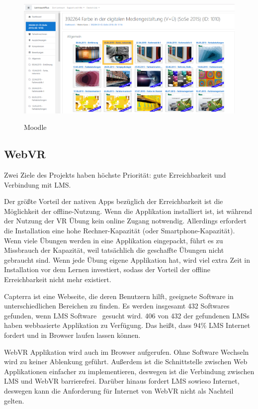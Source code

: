 \begin{figure}[ht]
\vspace*{1em}
\centering
\caption{Moodle}
\includegraphics[width=\textwidth]{images/moodleBeispiel.png}
\label{fig:moodleBeispiel} 
\end{figure}

 \subsection{WebVR}
 Zwei Ziele des Projekts haben höchste Priorität: gute Erreichbarkeit und Verbindung mit LMS.

 Der größte Vorteil der nativen Apps bezüglich der Erreichbarkeit ist die Möglichkeit der offline-Nutzung. Wenn die Applikation installiert ist, ist während der Nutzung der VR Übung kein online Zugang notwendig. Allerdings erfordert die Installation eine hohe Rechner-Kapazität (oder Smartphone-Kapazität). Wenn viele Übungen werden in eine Applikation eingepackt, führt es zu Missbrauch der Kapazität, weil tatsächlich die geschaffte Übungen nicht gebraucht sind. Wenn jede Übung eigene Applikation hat, wird viel extra Zeit in Installation vor dem Lernen investiert, sodass der Vorteil der offline Erreichbarkeit nicht mehr existiert.

 Capterra ist eine Webseite, die deren Benutzern hilft, geeignete Software in unterschiedlichen Bereichen zu finden. Es werden insgesamt 432 Softwares gefunden, wenn \glqq LMS Software \grqq\ gesucht wird. 406 von 432 der gefundenen LMSs haben webbasierte Applikation zu Verfügung. Das heißt, dass 94\% LMS Internet fordert und in Browser laufen lassen können.

 WebVR Applikation wird auch im Browser aufgerufen. Ohne Software Wechseln wird zu keiner Ablenkung geführt. Außerdem ist die Schnittstelle zwischen Web Applikationen einfacher zu implementieren, deswegen ist die Verbindung zwischen LMS und WebVR barrierefrei. Darüber hinaus fordert LMS sowieso Internet, deswegen kann die Anforderung für Internet von WebVR nicht als Nachteil gelten. 

